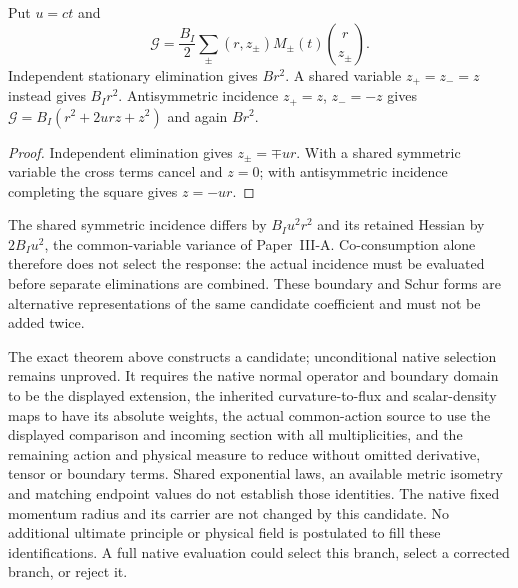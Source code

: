 \documentclass[12pt,a4paper]{article}
\begin{document}
\begin{proposition}
\label{p3e:prop:v223-port-incidence}
Put $u=ct$ and
\[
 \mathcal G=\frac{B_I}{2}\sum_\pm
 (r,z_\pm)M_\pm(t)\binom r{z_\pm}.
\]
Independent stationary elimination gives $Br^2$.  A shared variable
$z_+=z_-=z$ instead gives $B_Ir^2$.  Antisymmetric incidence
$z_+=z$, $z_-=-z$ gives
$\mathcal G=B_I(r^2+2urz+z^2)$ and again $Br^2$.
\end{proposition}
\begin{proof}
Independent elimination gives $z_\pm=\mp ur$.  With a shared symmetric
variable the cross terms cancel and $z=0$; with antisymmetric
incidence completing the square gives $z=-ur$.
\end{proof}
The shared symmetric incidence differs by $B_Iu^2r^2$ and its retained
Hessian by $2B_Iu^2$, the common-variable variance of Paper~III-A.
Co-consumption alone therefore does not select the response: the actual
incidence must be evaluated before separate eliminations are combined.
These boundary and Schur forms are alternative representations of the
same candidate coefficient and must not be added twice.

\begin{remark}
\label{p3e:rem:v223-native-selection}
The exact theorem above constructs a candidate; unconditional native
selection remains unproved.  It requires the native normal operator
and boundary domain to be the displayed extension, the inherited
curvature-to-flux and scalar-density maps to have its absolute weights,
the actual common-action source to use the displayed comparison and
incoming section with all multiplicities, and the remaining action and
physical measure to reduce without omitted derivative, tensor or
boundary terms.  Shared exponential laws, an available metric isometry
and matching endpoint values do not establish those identities.
The native fixed momentum radius and its carrier are not changed by
this candidate.  No additional ultimate principle or physical field is
postulated to fill these identifications.  A full native evaluation
could select this branch, select a corrected branch, or reject it.
\end{remark}
\end{document}
